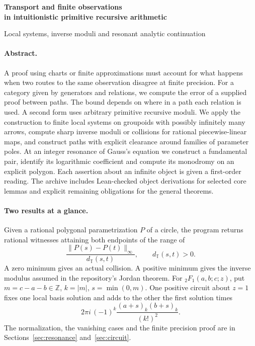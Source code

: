 \documentclass[11pt,letterpaper]{article}
\theoremstyle{definition}\newtheorem{definition}[theorem]{Definition}
\begin{document}
\thispagestyle{plain}
\par
\vspace{8pt}
{\noindent\LARGE\bfseries\color{ink} Transport and finite observations\\[3pt] in intuitionistic primitive recursive arithmetic\par}
\vspace{7pt}
{\noindent\large Local systems, inverse moduli and resonant analytic continuation\par}
\vspace{8pt}
\par
\vspace{7pt}\noindent{\color{accent}\rule{\linewidth}{1.1pt}}
\paragraph{Abstract.}
A proof using charts or finite approximations must account for what happens when two routes to the same observation disagree at finite precision. For a category given by generators and relations, we compute the error of a supplied proof between paths. The bound depends on where in a path each relation is used. A second form uses arbitrary primitive recursive moduli. We apply the construction to finite local systems on groupoids with possibly infinitely many arrows, compute sharp inverse moduli or collisions for rational piecewise-linear maps, and construct paths with explicit clearance around families of parameter poles. At an integer resonance of Gauss's equation we construct a fundamental pair, identify its logarithmic coefficient and compute its monodromy on an explicit polygon. Each assertion about an infinite object is given a first-order reading. The archive includes Lean-checked object derivations for selected core lemmas and explicit remaining obligations for the general theorems.

\paragraph{Two results at a glance.}
Given a rational polygonal parametrization $P$ of a circle, the program returns rational witnesses attaining both endpoints of the range of
\[
      \frac{\|P(s)-P(t)\|_\infty}{d_{\mathbb T}(s,t)},\qquad d_{\mathbb T}(s,t)>0 .
\]
A zero minimum gives an actual collision. A positive minimum gives the inverse modulus assumed in the repository's Jordan theorem. For ${}_2F_1(a,b;c;z)$, put $m=c-a-b\in\mathbb Z$, $k=|m|$, $s=\min(0,m)$. One positive circuit about $z=1$ fixes one local basis solution and adds to the other the first solution times
\[
             2\pi i\,(-1)^k\frac{(a+s)_k(b+s)_k}{(k!)^2}.
\]
The normalization, the vanishing cases and the finite precision proof are in Sections~\ref{sec:resonance} and~\ref{sec:circuit}.
\newpage
\tableofcontents
\end{document}
